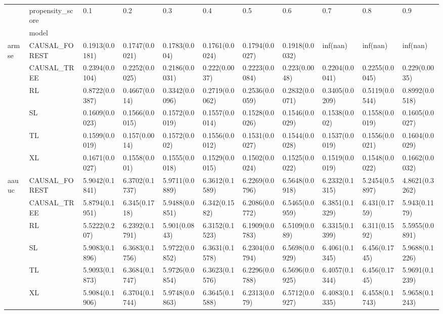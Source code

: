 \begin{tabular}{lllllllllll}
\toprule
      & propensity\_score &             0.1 &             0.2 &             0.3 &             0.4 &             0.5 &             0.6 &             0.7 &             0.8 &             0.9 \\
{} & model &                 &                 &                 &                 &                 &                 &                 &                 &                 \\
\midrule
armse & CAUSAL\_FOREST &  0.1913(0.0181) &  0.1747(0.0021) &   0.1783(0.004) &  0.1761(0.0024) &  0.1794(0.0027) &  0.1918(0.0032) &        inf(nan) &        inf(nan) &        inf(nan) \\
      & CAUSAL\_TREE &  0.2394(0.0104) &  0.2252(0.0025) &  0.2186(0.0031) &   0.222(0.0037) &  0.2223(0.0084) &   0.223(0.0048) &  0.2204(0.0041) &  0.2255(0.0045) &   0.229(0.0035) \\
      & RL &  0.8722(0.0387) &   0.4667(0.014) &  0.3342(0.0096) &  0.2719(0.0062) &  0.2536(0.0059) &  0.2832(0.0071) &  0.3405(0.0209) &  0.5119(0.0544) &  0.8992(0.0518) \\
      & SL &  0.1609(0.0023) &  0.1566(0.0015) &  0.1572(0.0019) &  0.1557(0.0014) &  0.1528(0.0026) &  0.1546(0.0029) &   0.1538(0.002) &  0.1558(0.0019) &  0.1605(0.0027) \\
      & TL &  0.1599(0.0019) &   0.157(0.0014) &   0.1572(0.002) &  0.1556(0.0012) &  0.1531(0.0027) &  0.1544(0.0028) &  0.1537(0.0019) &  0.1556(0.0021) &  0.1604(0.0029) \\
      & XL &  0.1671(0.0027) &   0.1558(0.001) &  0.1555(0.0018) &  0.1529(0.0015) &  0.1502(0.0024) &  0.1525(0.0022) &  0.1519(0.0019) &  0.1548(0.0022) &  0.1662(0.0032) \\
aauuc & CAUSAL\_FOREST &  5.9042(0.1841) &  6.3702(0.1737) &  5.9711(0.0889) &  6.3612(0.1589) &  6.2269(0.0796) &  6.5648(0.0918) &  6.2332(0.1315) &  5.2454(0.5897) &  4.8621(0.3262) \\
      & CAUSAL\_TREE &  5.8794(0.1951) &   6.345(0.1718) &  5.9488(0.0851) &   6.342(0.1582) &  6.2086(0.0772) &  6.5465(0.0959) &  6.3851(0.1329) &   6.431(0.1759) &   5.943(0.1179) \\
      & RL &   5.5222(0.207) &  6.2392(0.1791) &   5.901(0.0843) &  6.3152(0.1523) &  6.1909(0.0783) &   6.5109(0.089) &  6.3315(0.1399) &   6.311(0.1592) &  5.5955(0.0891) \\
      & SL &  5.9083(0.1896) &  6.3683(0.1756) &  5.9722(0.0852) &  6.3631(0.1578) &  6.2304(0.0794) &  6.5698(0.0929) &  6.4061(0.1345) &   6.456(0.1745) &  5.9688(0.1226) \\
      & TL &  5.9093(0.1873) &  6.3684(0.1747) &  5.9726(0.0854) &  6.3623(0.1576) &  6.2296(0.0788) &  6.5696(0.0925) &  6.4057(0.1344) &   6.456(0.1745) &  5.9691(0.1239) \\
      & XL &  5.9084(0.1906) &  6.3704(0.1744) &  5.9748(0.0863) &  6.3645(0.1588) &   6.2313(0.079) &  6.5712(0.0927) &  6.4083(0.1335) &  6.4558(0.1743) &  5.9658(0.1243) \\
\bottomrule
\end{tabular}
